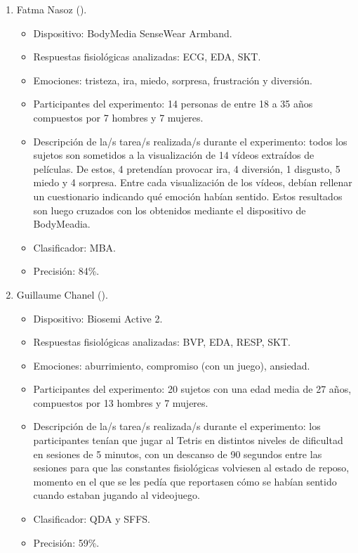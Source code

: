 \begin{enumerate}
    \item Fatma Nasoz (\citeyear{nasoz2004emotion}).
    \begin{itemize}
        \item Dispositivo: BodyMedia SenseWear Armband.
        \item Respuestas fisiológicas analizadas: ECG, EDA, SKT.
        \item Emociones: tristeza, ira, miedo, sorpresa, frustración y diversión.
        \item Participantes del experimento: 14 personas de entre 18 a 35 años compuestos por 7 hombres y 7 mujeres.
        \item Descripción de la/s tarea/s realizada/s durante el experimento: todos los sujetos son sometidos a la visualización de 14 vídeos extraídos de películas. De estos, 4 pretendían provocar ira, 4 diversión, 1 disgusto, 5 miedo y 4 sorpresa. Entre cada visualización de los vídeos, debían rellenar un cuestionario indicando qué emoción habían sentido. Estos resultados son luego cruzados con los obtenidos mediante el dispositivo de BodyMeadia.
        \item Clasificador: \ac{MBA}.
        \item Precisión: 84\%.
    \end{itemize}
    
    \item Guillaume Chanel (\citeyear{chanel2011emotion}).
    \begin{itemize}
        \item Dispositivo: Biosemi Active 2.
        \item Respuestas fisiológicas analizadas: BVP, EDA, RESP, SKT.
        \item Emociones: aburrimiento, compromiso (con un juego), ansiedad.
        \item Participantes del experimento: 20 sujetos con una edad media de 27 años, compuestos por 13 hombres y 7 mujeres.
        \item Descripción de la/s tarea/s realizada/s durante el experimento: los participantes tenían que jugar al Tetris en distintos niveles de dificultad en sesiones de 5 minutos, con un descanso de 90 segundos entre las sesiones para que las constantes fisiológicas volviesen al estado de reposo, momento en el que se les pedía que reportasen cómo se habían sentido cuando estaban jugando al videojuego.
        \item Clasificador: \ac{QDA} y \ac{SFFS}.
        \item Precisión: 59\%.
    \end{itemize}


\end{enumerate}
